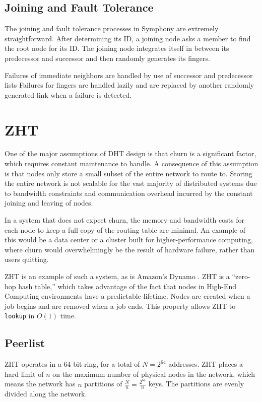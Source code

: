 \subsection*{Joining and Fault Tolerance}
The joining and fault tolerance processes in Symphony are extremely straightforward.
After determining its ID, a joining node asks a member to find the root node for its ID.
The joining node integrates itself in between its predecessor and successor and then randomly generates its fingers.

Failures of immediate neighbors are handled by use of successor and predecessor lists
Failures for fingers are handled lazily and are replaced by another randomly generated link when a failure is detected.

\section{ZHT}
One of the major assumptions of DHT design is that churn is a significant factor, which requires constant maintenance to handle.
A consequence of this assumption is that nodes only store a small subset of the entire network to route to.
Storing the entire network is not scalable for the vast majority of distributed systems due to bandwidth constraints and communication overhead incurred by the constant joining and leaving of nodes.

In a system that does not expect churn, the memory and bandwidth costs for each node to keep a full copy of the routing table are minimal.
An example of this would be a data center or a cluster built for higher-performance computing, where churn would overwhelmingly be the result of hardware failure, rather than users quitting.

ZHT \cite{li2013zht} is an example of such a system, as is Amazon's Dynamo \cite{dynamo}.
ZHT is a ``zero-hop hash table,'' which takes advantage of the fact that  nodes in  High-End Computing environments have a predictable lifetime.
Nodes are created when a job begins and are removed when a job ends.
This property allows ZHT to \texttt{lookup} in $ O(1) $ time.

\subsection*{Peerlist}

ZHT operates in a 64-bit ring, for a total of $N = 2^{64}$ addresses.
ZHT places a  hard limit of $ n $ on the maximum number of physical nodes in the network, which means the network has $n$ partitions of $\frac{N}{n} =  \frac{2^{64}}{n}$ keys.
The partitions are evenly divided along the network.

